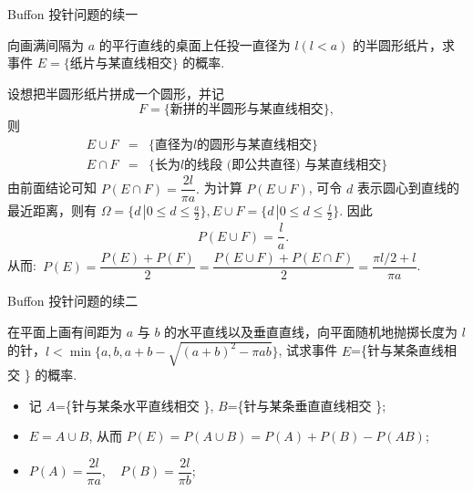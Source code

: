 \begin{frame}{{\rm Buffon} 投针问题的续一}
	\begin{exam}
		向画满间隔为 $a$ 的平行直线的桌面上任投一直径为 $l (l<a)$ 的半圆形纸片，求事件 $E=\{
			\mbox{纸片与某直线相交}\}$ 的概率.
	\end{exam}
	\pause



	\pause
	\jieda 设想把半圆形纸片拼成一个圆形，并记 $$F=\{\mbox{新拼的半圆形与某直线相交}\},$$
	则 \pause
	\begin{eqnarray*}
		E\cup F&=&\{\mbox{直径为} l\mbox{的圆形与某直线相交}\}\\
		E\cap F&=&\{\mbox{长为} l\mbox{的线段 (即公共直径) 与某直线相交}\}
	\end{eqnarray*}
	\pause 由前面结论可知 $	P (E\cap F)=\dfrac{2l}{\pi a}.$ \pause 为计算 $P (E\cup F)$, 可令 $d$ 表示圆心到直线的最近距离，则有 \pause
	$\Omega=\{d\,|0\leq d\leq \frac{a}{2}\},E\cup F=\{d\,|0\leq d\leq \frac{l}{2}\}.$ 因此
	\begin{eqnarray*}
		\quad P(E\cup F)=\dfrac{l}{a}.
	\end{eqnarray*}
	从而:\ \pause $P (E)=\dfrac{P (E)+P (F)}{2}=\dfrac{P (E\cup F)+P (E\cap F)}{2}=\dfrac{\pi l/2+l}{\pi a}$.
\end{frame}


\begin{frame}{{\rm Buffon} 投针问题的续二}
	\begin{exam}
		在平面上画有间距为 $a$ 与 $b$ 的水平直线以及垂直直线，向平面随机地抛掷长度为 $l$ 的针，$l<\min\{a,b,a+b-\sqrt{(a+b)^2-\pi ab}\}$, 试求事件 $E$=\{针与某条直线相交 \} 的概率.%
	\end{exam}
	\vspace{0.5cm}
	\pause
	\begin{itemize}[<+-|alert@+>]
		\item 记 $A$=\{针与某条水平直线相交 \}, $B$=\{针与某条垂直直线相交 \};
		\item $E=A\cup B$, 从而 \pause $P (E)=P (A\cup B)=P (A)+P (B)-P (AB)$;
		\item $P(A)=\dfrac{2l}{\pi a},\quad P(B)=\dfrac{2l}{\pi b}$;

	\end{itemize}

\end{frame}

